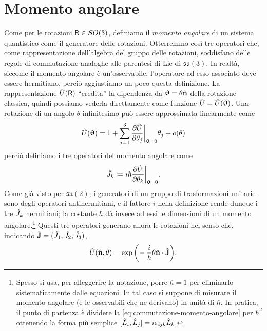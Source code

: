 \section{Momento angolare}
Come per le rotazioni $\mathsf{R}\in SO(3)$, definiamo il \emph{momento angolare} di un sistema quantistico come il generatore delle rotazioni.
Otterremmo cos\`i tre operatori che, come rappresentazione dell'algebra del gruppo delle rotazioni, soddisfano delle regole di commutazione analoghe alle parentesi di Lie di $\mathfrak{so}(3)$.
In realtà, siccome il momento angolare è un'osservabile, l'operatore ad esso associato deve essere hermitiano, perciò aggiustiamo un poco questa definizione.
La rappresentazione $\hat{U}(\mathsf{R})$ ``eredita'' la dipendenza da $\bm{\uptheta}=\theta\hat{\mathbf{n}}$ della rotazione classica, quindi possiamo vederla direttamente come funzione $\hat{U}=\hat{U}(\bm{\uptheta})$.
Una rotazione di un angolo $\theta$ infinitesimo può essere approssimata linearmente come
\begin{equation}
	\hat{U}(\bm{\uptheta})=1+\sum_{j=1}^3\frac{\partial {\hat{U}}}{\partial {\theta_j}}\bigg|_{\bm{\uptheta}=0}\theta_j+o(\theta)
\end{equation}
perciò definiamo i tre operatori del momento angolare come
\begin{equation}
	\op J_k\defeq i\hbar\drp{\op U}{\theta_k}\bigg|_{\vtheta=0}.
	\label{eq:def-momento-angolare}
\end{equation}
Come già visto per $\mathfrak{su}(2)$, i generatori di un gruppo di trasformazioni unitarie sono degli operatori antihermitiani, e il fattore $i$ nella definizione rende dunque i tre $\hat{J}_k$ hermitiani; la costante $\hbar$ dà invece ad essi le dimensioni di un momento angolare.\footnote{
	Spesso si usa, per alleggerire la notazione, porre $\hbar=1$ per eliminarlo sistematicamente dalle equazioni.
	In tal caso si suppone di misurare il momento angolare (e le osservabili che ne derivano) in unità di $\hbar$.
	In pratica, il punto di partenza è dividere la \eqref{eq:commutazione-momento-angolare} per $\hbar^2$ ottenendo la forma più semplice $[\hat{L}_i,\hat{L}_j]=i\varepsilon_{ijk}\hat{L}_k$.
}
Questi tre operatori generano allora le rotazioni nel senso che, indicando $\hat{\mathbf{J}}=(\hat{J}_1,\hat{J}_2,\hat{J}_3)$,
\begin{equation}
	\hat{U}(\hat{\mathbf{n}},\theta)=\exp\bigg(\!-\frac{i}{\hbar}\theta{\hat{\mathbf{n}}}\cdot{\hat{\mathbf{J}}}\bigg).
\end{equation}

